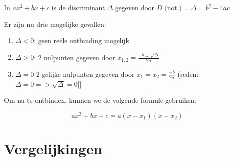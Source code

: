In \(a x^2 + bx + c \) is de discriminant \( \Delta \) gegeven door \(D \textrm{ (not.)}= \Delta = b^2 - 4ac \)

Er zijn nu drie mogelijke gevallen:

\begin{enumerate}
	\item \(\Delta < 0 \): geen reële ontbinding mogelijk
	\item \(\Delta > 0 \): 2 nulpunten gegeven door \( x_{1,2} = \frac{-b \pm \sqrt{\Delta}}{2a} \)
	\item \(\Delta = 0\) 2 gelijke nulpunten gegeven door \( x_1 = x_2 = \frac{-b}{2a} \) (reden: \(\Delta = 0 => \sqrt{\Delta} = 0 \)[]
\end{enumerate}

Om nu te ontbinden, kunnen we de volgende formule gebruiken:

\[ ax^2 + bx + c = a(x - x_1)(x - x_2) \]


\section{Vergelijkingen}


